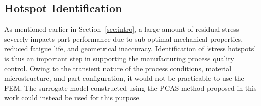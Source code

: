 \subsection{Hotspot Identification}
\label{sub:hotspot}

As mentioned earlier in Section~\ref{sec:intro}, a large amount of residual stress severely impacts part
performance due to sub-optimal mechanical properties, reduced fatigue life, and geometrical inaccuracy. 
Identification of `stress hotspots' is thus an important step in supporting the manufacturing process
quality control.
Owing to the transient nature of the process conditions, material microstructure, and part configuration,
it would not be practicable to use the FEM. The surrogate model constructed using the PCAS method
proposed in this work could instead be used for this purpose.

